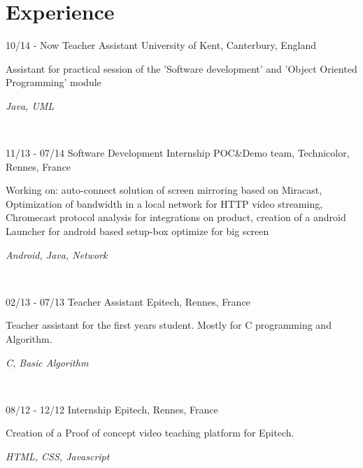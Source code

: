 \documentclass[]{friggeri-cv}
\begin{document}
\section{Experience}
\begin{entrylist}
  \entry
    {10/14 - Now}
    {Teacher Assistant}
    {University of Kent, Canterbury, England}
    {Assistant for practical session of the 'Software development' and 'Object Oriented Programming' module
    \begin{FlushRight}\textit{Java, UML}\end{FlushRight}~}
  \entry
    {11/13 - 07/14}
    {Software Development Internship}
    {POC\&Demo team, Technicolor, Rennes, France}
    {Working on: auto-connect solution of screen mirroring based on Miracast, Optimization of bandwidth in a local network for HTTP video streaming, Chromecast protocol analysis for integrations on product, creation of a android Launcher for android based setup-box optimize for big screen \begin{FlushRight}\textit{Android, Java, Network}\end{FlushRight} ~}
    \entry
    {02/13 - 07/13}
    {Teacher Assistant}
    {Epitech, Rennes, France}
    {Teacher assistant for the first years student. Mostly for C programming and Algorithm.
    \begin{FlushRight}\textit{C, Basic Algorithm}\end{FlushRight} ~}
    \entry
    {08/12 - 12/12}
    {Internship}
    {Epitech, Rennes, France}
    {Creation of a Proof of concept video teaching platform for Epitech.
    \begin{FlushRight}\textit{HTML, CSS, Javascript}\end{FlushRight}}
\end{entrylist}
\end{document}

